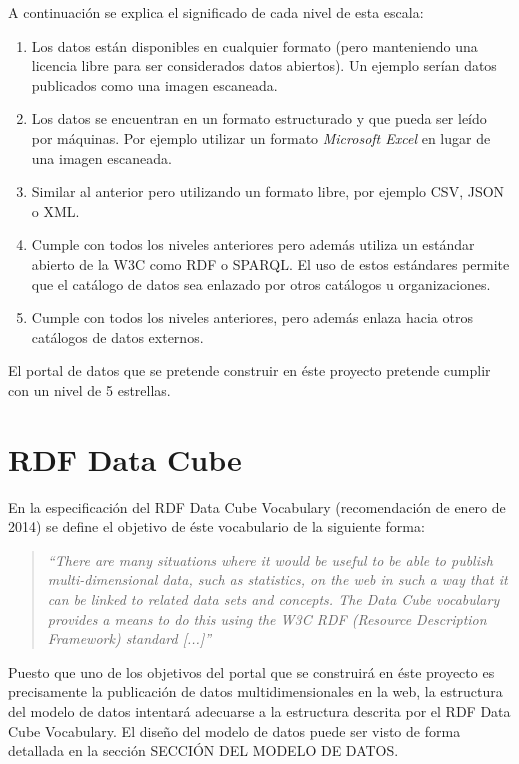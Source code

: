 A continuación se explica el significado de cada nivel de esta escala:
\begin{enumerate}
    \item Los datos están disponibles en cualquier formato (pero manteniendo una licencia libre para ser considerados datos abiertos).  Un ejemplo serían datos publicados como una imagen escaneada.
    \item Los datos se encuentran en un formato estructurado y que pueda ser leído por máquinas.  Por ejemplo utilizar un formato \textit{Microsoft Excel} en lugar de una imagen escaneada.
    \item Similar al anterior pero utilizando un formato libre, por ejemplo CSV, JSON o XML.
    \item Cumple con todos los niveles anteriores pero además utiliza un estándar abierto de la W3C como RDF o SPARQL.  El uso de estos estándares permite que el catálogo de datos sea enlazado por otros catálogos u organizaciones.
    \item Cumple con todos los niveles anteriores, pero además enlaza hacia otros catálogos de datos externos.
\end{enumerate}

El portal de datos que se pretende construir en éste proyecto pretende cumplir con un nivel de 5 estrellas.



\section{RDF Data Cube}
En la especificación del RDF Data Cube Vocabulary (recomendación de enero de 2014) \cite{w3c:data-cube} se define el objetivo de éste vocabulario de la siguiente forma:
\begin{quote}
\textit{``There are many situations where it would be useful to be able to publish multi-dimensional data, such as statistics, on the web in such a way that it can be linked to related data sets and concepts. The Data Cube vocabulary provides a means to do this using the W3C RDF (Resource Description Framework) standard [...]''}
\end{quote}

Puesto que uno de los objetivos del portal que se construirá en éste proyecto es precisamente la publicación de datos multidimensionales en la web, la estructura del modelo de datos intentará adecuarse a la estructura descrita por el RDF Data Cube Vocabulary.  El diseño del modelo de datos puede ser visto de forma detallada en la sección SECCIÓN DEL MODELO DE DATOS.

